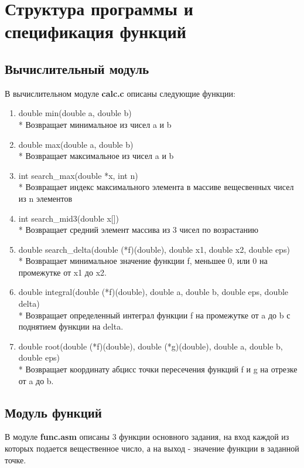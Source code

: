 \documentclass[a4paper,12pt,titlepage,finall]{article}
\begin{document}
\newpage

\section{Структура программы и спецификация функций}

\subsection{Вычислительный модуль}
В вычислительном модуле \textbf{calc.c} описаны следующие функции:

\begin{enumerate}
    \item double min(double a, double b)
    \\* Возвращает минимальное из чисел a и b
    \item double max(double a, double b)
    \\* Возвращает максимальное из чисел a и b
    \item int search\_max(double *x, int n)
    \\* Возвращает индекс максимального элемента в массиве вещесвенных чисел из n элементов
    \item int search\_mid3(double x[])
    \\* Возвращает средний элемент массива из 3 чисел по возрастанию
    \item double search\_delta(double (*f)(double), double x1, double x2, double eps)
    \\* Возвращает минимальное значение функции f, меньшее 0, или 0 на промежутке от x1 до x2.
    \item double integral(double (*f)(double), double a, double b, double eps, double delta)
    \\* Возвращает определенный интеграл функции f на промежутке от a до b с поднятием функции на delta.
    \item double root(double (*f)(double), double (*g)(double), double a, double b, double eps)
    \\* Возвращает координату абцисс точки пересечения функций f и g на отрезке от a до b.
\end{enumerate}

\subsection{Модуль функций}

В модуле \textbf{func.asm} описаны 3 функции основного задания, на вход каждой из которых подается вещественное число, а на выход - значение функции в заданной точке.
\end{document}

